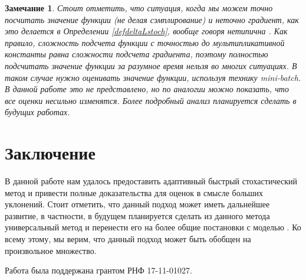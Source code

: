 \documentclass[11pt,a4]{article}
\newtheorem{remark}{Замечание}
\begin{document}
\begin{remark}
\leavevmode
Стоит отметить, что ситуация, когда мы можем точно посчитать значение функции (не делая сэмплирование) и неточно градиент, как это делается в Определении \ref{defdeltaLstoch}, вообще говоря нетипична \cite{baydin2015automatic,krizhevsky2012imagenet}. Как правило, сложность подсчета функции с точностью до мультипликативной константы равна сложности подсчета градиента, поэтому полностью подсчитать значение функции за разумное время нельзя во многих ситуациях. В таком случае нужно оценивать значение функции, используя технику mini-batch. В данной работе это не представлено, но по аналогии можно показать, что все оценки несильно изменятся. Более подробный анализ планируется сделать в будущих работах.   
\end{remark}

\section{Заключение}
В данной работе нам удалось предоставить адаптивный быстрый стохастический метод и привести полные доказательства для оценок в смысле больших уклонений. Стоит отметить, что данный подход может иметь дальнейшее развитие, в частности, в будущем планируется сделать из данного метода универсальный метод \cite{nesterov2015universal} и перенести его на более общие постановки с моделью \cite{tyurin2017fast}. Ко всему этому, мы верим, что данный подход может быть обобщен на произвольное множество.

Работа была поддержана грантом РНФ 17-11-01027. 



\end{document}
